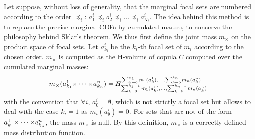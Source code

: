 Let suppose, without loss of generality, that the marginal focal sets are numbered according to the order $\preceq_i$: $a^i_1\preceq_ia^i_2\preceq_i\dots\preceq_i a^i_{N_i}$. The idea behind this method is to replace the precise marginal CDFs by cumulated masses, to conserve the philosophy behind Sklar's theorem. We thus first define the joint mass $m_\times$ on the product space of focal sets. Let $a_{k_i}^i$ be the $k_i$-th focal set of $m_i$ according to the chosen order. $m_\times$ is computed as the H-volume of copula $C$ computed over the cumulated marginal masses:
\begin{eqnarray}\label{eq:joint_mass}
    m_\times(a^1_{k_1}{\times\dots\times} a^n_{k_n}) = H_{\sum_{k=0}^{k_1-1}m_1(a^1_k), \dots, \sum_{k=0}^{k_n-1}m_n(a^n_k)}^{\sum_{k=0}^{k_1}m_1(a^1_k), \dots, \sum_{k=0}^{k_n}m_n(a^n_k)}
\end{eqnarray}
with the convention that $\forall i,\, a^i_0=\emptyset$, which is not strictly a focal set but allows to deal with the case $k_i=1$ as $m_i(a^i_0)=0$. For sets that are not of the form $a^1_{k_1}{\times\dots\times} a^n_{k_n}$, the mass $m_\times$ is null. By this definition, $m_\times$ is a correctly defined mass distribution function.
